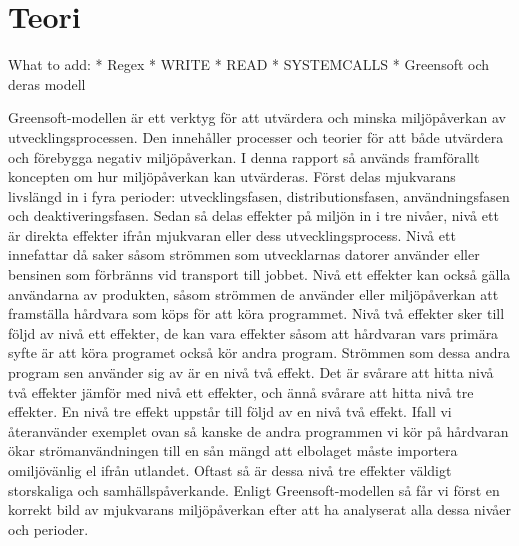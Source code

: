 \section{Teori}
\label{sec:joel_a-theory}

What to add:
* Regex
* WRITE
* READ
* SYSTEMCALLS
* Greensoft och deras modell


Greensoft-modellen är ett verktyg för att utvärdera och minska miljöpåverkan av utvecklingsprocessen. Den innehåller processer och teorier för att både utvärdera och förebygga negativ miljöpåverkan. I denna rapport så används framförallt koncepten om hur miljöpåverkan kan utvärderas. Först delas mjukvarans livslängd in i fyra perioder: utvecklingsfasen, distributionsfasen, användningsfasen och deaktiveringsfasen. Sedan så delas effekter på miljön in i tre nivåer, nivå ett är direkta effekter ifrån mjukvaran eller dess utvecklingsprocess. Nivå ett innefattar då saker såsom strömmen som utvecklarnas datorer använder eller bensinen som förbränns vid transport till jobbet. Nivå ett effekter kan också gälla användarna av produkten, såsom strömmen de använder eller miljöpåverkan att framställa hårdvara som köps för att köra programmet. Nivå två effekter sker till följd av nivå ett effekter, de kan vara effekter såsom att hårdvaran vars primära syfte är att köra programet också kör andra program. Strömmen som dessa andra program sen använder sig av är en nivå två effekt. Det är svårare att hitta nivå två effekter jämför med nivå ett effekter, och ännå svårare att hitta nivå tre effekter. En nivå tre effekt uppstår till följd av en nivå två effekt. Ifall vi återanvänder exemplet ovan så kanske de andra programmen vi kör på hårdvaran ökar strömanvändningen till en sån mängd att elbolaget måste importera omiljövänlig el ifrån utlandet. Oftast så är dessa nivå tre effekter väldigt storskaliga och samhällspåverkande. Enligt Greensoft-modellen så får vi först en korrekt bild av mjukvarans miljöpåverkan efter att ha analyserat alla dessa nivåer och perioder. 